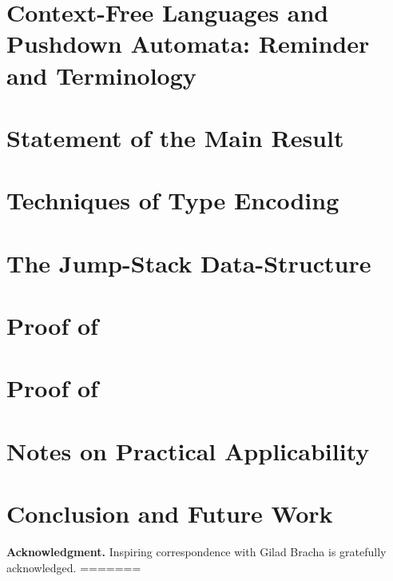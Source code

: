 \documentclass[a4paper,USenglish]{lipics}
\begin{document}
\section{Context-Free Languages and Pushdown Automata: Reminder and Terminology}
\label{Section:pushdown}


\section{Statement of the Main Result} 
\label{Section:result}


\section{Techniques of Type Encoding}
\label{Section:toolkit}


\section{The Jump-Stack Data-Structure}
\label{Section:jump}


\section{Proof of }
\label{Section:proof}


\section{Proof of }
\label{Section:prefix}


\section{Notes on Practical Applicability}
\label{Section:applicability}


\section{Conclusion and Future Work}
\label{Section:zz}


\textbf{Acknowledgment.}
Inspiring correspondence with Gilad Bracha is gratefully acknowledged. 
=======


\end{document}
